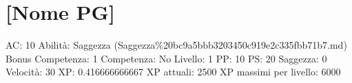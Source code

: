 \section{{[}Nome PG{]}}\label{nome-pg}

AC: 10 Abilità: Saggezza
(Saggezza\%20bc9a5bbb3203450c919e2c335fbb71b7.md) Bonus Competenza: 1
Competenza: No Livello: 1 PP: 10 PS: 20 Saggezza: 0 Velocità: 30 XP:
0.416666666667 XP attuali: 2500 XP massimi per livello: 6000
